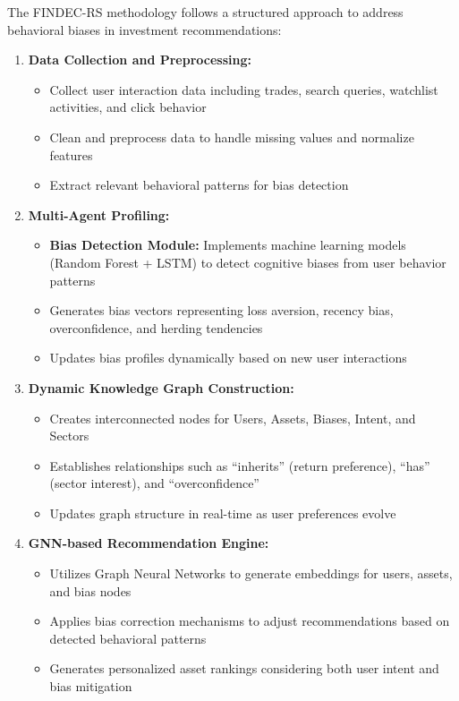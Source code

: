 \documentclass[12pt, a4paper]{article}
\begin{document}
The FINDEC-RS methodology follows a structured approach to address behavioral biases in investment recommendations:

\begin{enumerate}[leftmargin=1.5cm]
  \item \textbf{Data Collection and Preprocessing:}
  \begin{itemize}
    \item Collect user interaction data including trades, search queries, watchlist activities, and click behavior
    \item Clean and preprocess data to handle missing values and normalize features
    \item Extract relevant behavioral patterns for bias detection
  \end{itemize}
  
  \item \textbf{Multi-Agent Profiling:}
  \begin{itemize}
    \item \textbf{Bias Detection Module:} Implements machine learning models (Random Forest + LSTM) to detect cognitive biases from user behavior patterns
    \item Generates bias vectors representing loss aversion, recency bias, overconfidence, and herding tendencies
    \item Updates bias profiles dynamically based on new user interactions
  \end{itemize}
  
  \item \textbf{Dynamic Knowledge Graph Construction:}
  \begin{itemize}
    \item Creates interconnected nodes for Users, Assets, Biases, Intent, and Sectors
    \item Establishes relationships such as ``inherits'' (return preference), ``has'' (sector interest), and ``overconfidence''
    \item Updates graph structure in real-time as user preferences evolve
  \end{itemize}
  
  \item \textbf{GNN-based Recommendation Engine:}
  \begin{itemize}
    \item Utilizes Graph Neural Networks to generate embeddings for users, assets, and bias nodes
    \item Applies bias correction mechanisms to adjust recommendations based on detected behavioral patterns
    \item Generates personalized asset rankings considering both user intent and bias mitigation
  \end{itemize}
  

\end{enumerate}
\end{document}
